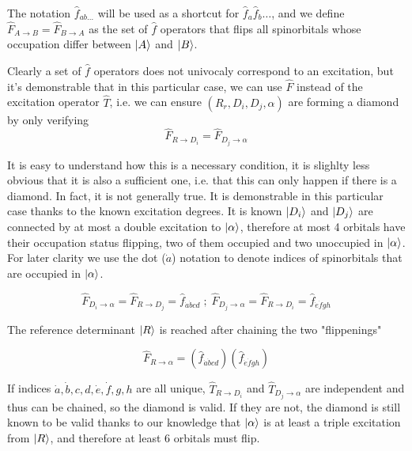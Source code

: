 \documentclass[./thesis.tex]{subfiles}
\begin{document}
The notation $\hat f_{ab\ldots}$ will be used as a shortcut for $\hat f_a \hat f_b \ldots$, and we define $\hat F_{A \rightarrow B} = \hat F_{B \rightarrow A}$ as the set of $\hat f$ operators that flips all spinorbitals whose occupation differ between $\ket A$ and $\ket B$.

Clearly a set of $\hat f$ operators does not univocaly correspond to an excitation, but it's demonstrable that in this particular case, we can use $\hat F$ instead of the excitation operator $\hat T$, i.e. we can ensure $(R_r, D_i, D_j, \alpha)$ are forming a diamond by only verifying
\begin{equation}
\hat F_{R \rightarrow D_i} = \hat F_{D_j \rightarrow \alpha}
\label{eq:diamond_flip}
\end{equation}

It is easy to understand how this is a necessary condition, it is slighlty less obvious that it is also a sufficient one, i.e. that this can only happen if there is a diamond. In fact, it is not generally true. It is demonstrable in this particular case thanks to the known excitation degrees. It is known $\ket {D_i}$ and $\ket {D_j}$ are connected by at most a double excitation to ${\ket{\alpha}}$, therefore at most 4 orbitals have their occupation status flipping, two of them occupied and two unoccupied in ${\ket{\alpha}}$. For later clarity we use the dot ($\dot a$) notation to denote indices of spinorbitals that are occupied in ${\ket{\alpha}}$.

\begin{equation}
\hat F_{D_i \rightarrow \alpha} = \hat F_{R \rightarrow D_j} = \hat f_{\dot a \dot bcd} \; ; \; \hat F_{D_j \rightarrow \alpha} = \hat F_{R \rightarrow D_i} = \hat f_{\dot e \dot fgh}
\end{equation}

The reference determinant $\ket R$ is reached after chaining the two "flippenings"

\begin{equation}
\hat F_{R \rightarrow \alpha} = (\hat f_{\dot a \dot bcd})(\hat f_{\dot e \dot fgh})
\end{equation}

If indices $\dot a,\dot b,c,d,\dot e,\dot f,g,h$ are all unique, $\hat T_{R \rightarrow D_i}$ and $\hat T_{D_j \rightarrow \alpha}$ are independent and thus can be chained, so the diamond is valid. If they are not, the diamond is still known to be valid thanks to our knowledge that ${\ket{\alpha}}$ is at least a triple excitation from $\ket R$, and therefore at least 6 orbitals must flip. 
\end{document}
